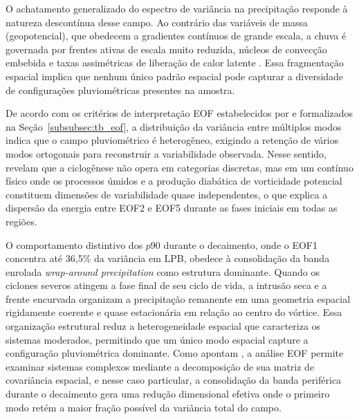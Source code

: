 O achatamento generalizado do espectro de variância na precipitação responde à natureza descontínua desse campo.
Ao contrário das variáveis de massa (geopotencial), que obedecem a gradientes contínuos de grande escala, a chuva é governada por frentes ativas de escala muito reduzida, núcleos de convecção embebida e taxas assimétricas de liberação de calor latente \citep{oertel2021warm}.
Essa fragmentação espacial implica que nenhum único padrão espacial pode capturar a diversidade de configurações pluviométricas presentes na amostra.

De acordo com os critérios de interpretação EOF estabelecidos por \citet{hannachi2007empirical} e formalizados na Seção~\ref{subsubsec:tb_eof}, a distribuição da variância entre múltiplos modos indica que o campo pluviométrico é heterogêneo, exigindo a retenção de vários modos ortogonais para reconstruir a variabilidade observada.
Nesse sentido, \citet{graf2017objective} revelam que a ciclogênese não opera em categorias discretas, mas em um contínuo físico onde os processos úmidos e a produção diabática de vorticidade potencial constituem dimensões de variabilidade quase independentes, o que explica a dispersão da energia entre EOF2 e EOF5 durante as fases iniciais em todas as regiões.

O comportamento distintivo dos $p90$ durante o decaimento, onde o EOF1 concentra até 36,5\% da variância em LPB, obedece à consolidação da banda enrolada \textit{wrap-around precipitation} como estrutura dominante.
Quando os ciclones severos atingem a fase final de seu ciclo de vida, a intrusão seca e a frente encurvada organizam a precipitação remanente em uma geometria espacial rigidamente coerente e quase estacionária em relação ao centro do vórtice.
Essa organização estrutural reduz a heterogeneidade espacial que caracteriza os sistemas moderados, permitindo que um único modo espacial capture a configuração pluviométrica dominante.
Como apontam \citet{hannachi2023eof}, a análise EOF permite examinar sistemas complexos mediante a decomposição de sua matriz de covariância espacial, e nesse caso particular, a consolidação da banda periférica durante o decaimento gera uma redução dimensional efetiva onde o primeiro modo retém a maior fração possível da variância total do campo.

